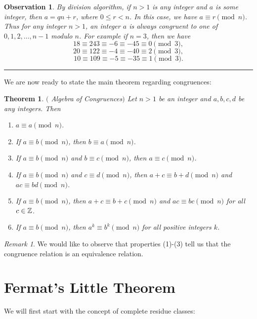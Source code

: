 \documentclass[12pt]{article}
\theoremstyle{plain}
\newtheorem{observation}{Observation}
\newtheorem{theorem}{Theorem}
\theoremstyle{definition}
\theoremstyle{remark}
\newtheorem{remark}{Remark}
\begin{document}
\bigskip
\begin{observation}
By division algorithm, if $n>1$ is any integer and $a$ is some integer, then $a=qn+r$, where $0\leq r <n$. In this case, we have $a\equiv r \pmod{n}$. Thus for any integer $n>1$, an integer $a$ is always congruent to one of $0, 1, 2, \dots, n-1$ modulo $n$. 
For example if $n=3$, then we have 
$$18\equiv 243\equiv -6 \equiv -45 \equiv 0 \pmod{3},$$
$$20\equiv 122\equiv -4 \equiv -40 \equiv 2 \pmod{3},$$
$$10\equiv 109\equiv -5 \equiv -35 \equiv 1 \pmod{3}.$$
\end{observation}
\hrule

\bigskip
\noindent
We are now ready to state the main theorem regarding congruences:
\begin{theorem}$($ Algebra of Congruences$)$
Let $n>1$ be an integer and $a, b, c, d$ be any integers. Then 
\begin{enumerate}
    \item $a\equiv a \pmod{n}$.
    \item If $a\equiv b \pmod{n}$, then $b\equiv a \pmod{n}$.
    \item If $a\equiv b \pmod{n}$ and $b\equiv c \pmod{n}$, then $a\equiv c \pmod{n}$.
    \item If $a\equiv b \pmod{n}$ and $c\equiv d \pmod{n}$, then $a+c\equiv b+d \pmod{n}$ and $ac\equiv bd \pmod{n}$. 
    \item If $a\equiv b \pmod{n}$, then $a+c\equiv b+c \pmod{n}$ and $ac\equiv bc \pmod{n}$ for all $c\in \mathbb{Z}$. 
    \item If $a\equiv b \pmod{n}$, then $a^k \equiv b^k \pmod{n}$ for all positive integers $k$. 
\end{enumerate}
\end{theorem}

\begin{remark}
We would like to observe that properties (1)-(3) tell us that the congruence relation is an equivalence relation.
\end{remark}

\section{Fermat's Little Theorem}
We will first start with the concept of complete residue classes:
\end{document}
